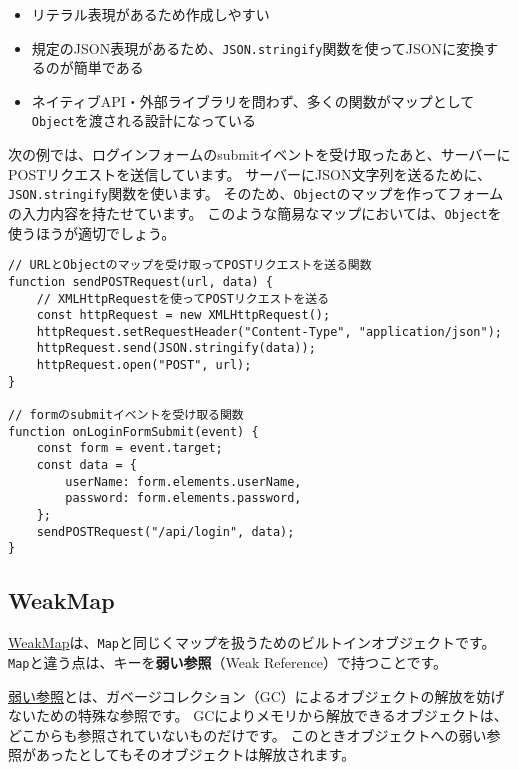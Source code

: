 \begin{itemize}
\item
  リテラル表現があるため作成しやすい
\item
  規定のJSON表現があるため、\texttt{JSON.stringify}関数を使ってJSONに変換するのが簡単である
\item
  ネイティブAPI・外部ライブラリを問わず、多くの関数がマップとして\texttt{Object}を渡される設計になっている
\end{itemize}

次の例では、ログインフォームのsubmitイベントを受け取ったあと、サーバーにPOSTリクエストを送信しています。
サーバーにJSON文字列を送るために、\texttt{JSON.stringify}関数を使います。
そのため、\texttt{Object}のマップを作ってフォームの入力内容を持たせています。
このような簡易なマップにおいては、\texttt{Object}を使うほうが適切でしょう。

\begin{lstlisting}
// URLとObjectのマップを受け取ってPOSTリクエストを送る関数
function sendPOSTRequest(url, data) {
    // XMLHttpRequestを使ってPOSTリクエストを送る
    const httpRequest = new XMLHttpRequest();
    httpRequest.setRequestHeader("Content-Type", "application/json");
    httpRequest.send(JSON.stringify(data));
    httpRequest.open("POST", url);
}

// formのsubmitイベントを受け取る関数
function onLoginFormSubmit(event) {
    const form = event.target;
    const data = {
        userName: form.elements.userName,
        password: form.elements.password,
    };
    sendPOSTRequest("/api/login", data);
}
\end{lstlisting}

\hypertarget{weakmap}{%
\subsection{WeakMap}\label{weakmap}}

\href{https://developer.mozilla.org/ja/docs/Web/JavaScript/Reference/Global_Objects/WeakMap}{WeakMap}は、\texttt{Map}と同じくマップを扱うためのビルトインオブジェクトです。
\texttt{Map}と違う点は、キーを\textbf{弱い参照}（Weak
Reference）で持つことです。

\href{https://ja.wikipedia.org/wiki/\%E5\%BC\%B1\%E3\%81\%84\%E5\%8F\%82\%E7\%85\%A7}{弱い参照}とは、ガベージコレクション（GC）によるオブジェクトの解放を妨げないための特殊な参照です。
GCによりメモリから解放できるオブジェクトは、どこからも参照されていないものだけです。
このときオブジェクトへの弱い参照があったとしてもそのオブジェクトは解放されます。

